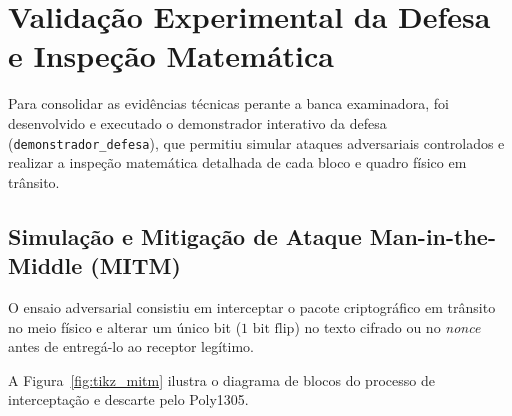 \section{Validação Experimental da Defesa e Inspeção Matemática}
\label{sec:validacao_defesa}

Para consolidar as evidências técnicas perante a banca examinadora, foi desenvolvido e executado o demonstrador interativo da defesa (\texttt{demonstrador\_defesa}), que permitiu simular ataques adversariais controlados e realizar a inspeção matemática detalhada de cada bloco e quadro físico em trânsito.

\subsection{Simulação e Mitigação de Ataque Man-in-the-Middle (MITM)}
\label{subsec:mitm_attack}

O ensaio adversarial consistiu em interceptar o pacote criptográfico em trânsito no meio físico e alterar um único bit ($1\text{ bit flip}$) no texto cifrado ou no \textit{nonce} antes de entregá-lo ao receptor legítimo.

A Figura~\ref{fig:tikz_mitm} ilustra o diagrama de blocos do processo de interceptação e descarte pelo Poly1305.

